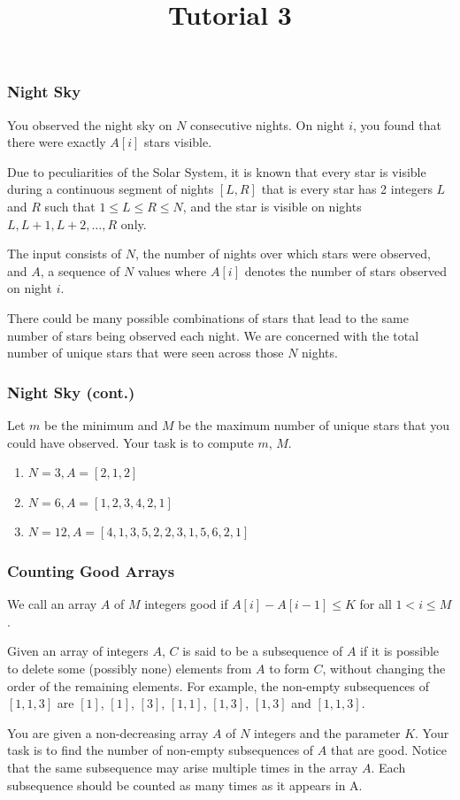 \documentclass{beamer}
\title{Tutorial 3}
\date{}
\begin{document}
\frame{\titlepage}

\begin{frame}[fragile]
\frametitle{Night Sky}

You observed the night sky on $N$ consecutive nights. On night $i$, you found that there were exactly $A[i]$ stars visible.

Due to peculiarities of the Solar System, it is known that every star is visible during a continuous segment of nights $[L, R]$ that is every star has 2 integers $L$ and $R$ such that $1 \leq L \leq R \leq N$, and the star is visible on nights $L, L + 1, L + 2, \ldots, R$ only.

The input consists of $N$, the number of nights over which stars were observed, and $A$, a sequence of $N$ values where $A[i]$ denotes the number of stars observed on night $i$.

There could be many possible combinations of stars that lead to the same number of stars being observed each night. We are concerned with the total number of unique stars that were seen across those $N$ nights.

\end{frame}

\begin{frame}
\frametitle{Night Sky (cont.)}
Let $m$ be the minimum and $M$ be the maximum number of unique stars that you could have observed. Your task is to compute $m$, $M$.

\begin{enumerate}
\item[(a)] $N = 3, A = [2, 1, 2]$
\item[(b)] $N = 6, A = [1, 2, 3, 4, 2, 1]$
\item[(c)] $N = 12, A = [4, 1, 3, 5, 2, 2, 3, 1, 5, 6, 2, 1]$
\end{enumerate}
\end{frame}

\begin{frame}
\end{frame}


\begin{frame}[fragile]
\frametitle{Counting Good Arrays}

We call an array $A$ of $M$ integers good if $A[i] - A[i - 1] \leq K$ for all $1 < i \leq M$.

Given an array of integers $A$, $C$ is said to be a subsequence of $A$ if it is possible to delete some (possibly none) elements from $A$ to form $C$, without changing the order of the remaining elements. For example, the non-empty subsequences of $[1, 1, 3]$ are $[1]$, $[1]$, $[3]$, $[1, 1]$, $[1, 3]$, $[1, 3]$ and $[1, 1, 3]$.

You are given a non-decreasing array $A$ of $N$ integers and the parameter $K$. Your task is to find the number of non-empty subsequences of $A$ that are good. Notice that the same subsequence may arise multiple times in the array $A$. Each subsequence should be counted as many times as it appears in A.
\end{frame}
\end{document}
